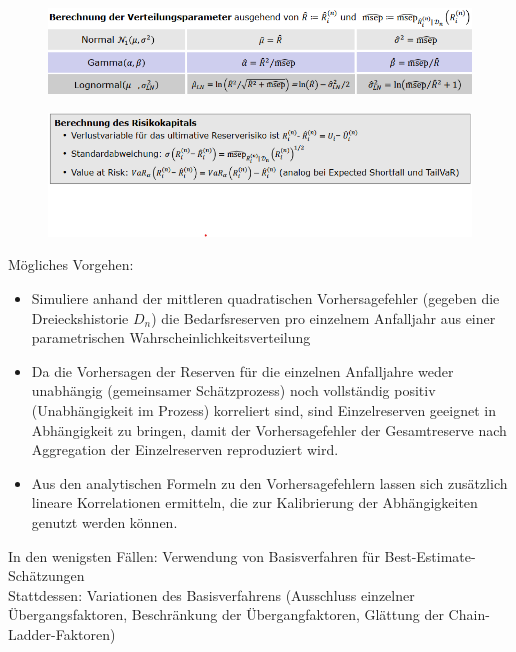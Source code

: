 \documentclass[12pt]{report}
\theoremstyle{dotless}
\theoremstyle{definition}
\begin{document}
\begin{figure}[ht]
	\centering
	\includegraphics[width= \textwidth]{Bilder/Verteilungsparameter.png}
\end{figure}

\begin{figure}
	\centering
	\includegraphics[width= \textwidth]{Bilder/Risikokapital.png}
\end{figure}

\vspace{1cm}
Mögliches Vorgehen:
\begin{itemize}
\item Simuliere anhand der mittleren quadratischen Vorhersagefehler (gegeben die Dreieckshistorie $D_n$) die Bedarfsreserven pro einzelnem Anfalljahr aus einer parametrischen Wahrscheinlichkeitsverteilung
\item Da die Vorhersagen der Reserven für die einzelnen Anfalljahre weder unabhängig (gemeinsamer
Schätzprozess) noch vollständig positiv (Unabhängigkeit im Prozess) korreliert sind, sind Einzelreserven geeignet in Abhängigkeit zu bringen, damit der Vorhersagefehler der Gesamtreserve nach Aggregation der Einzelreserven reproduziert wird.
\item Aus den analytischen Formeln zu den Vorhersagefehlern lassen sich zusätzlich lineare Korrelationen ermitteln, die zur Kalibrierung der Abhängigkeiten genutzt werden können.
\end{itemize} 

In den wenigsten Fällen: Verwendung von Basisverfahren für Best-Estimate-Schätzungen \\
Stattdessen: Variationen des Basisverfahrens (Ausschluss einzelner Übergangsfaktoren, Beschränkung der Übergangfaktoren, Glättung der Chain-Ladder-Faktoren)
\end{document}
